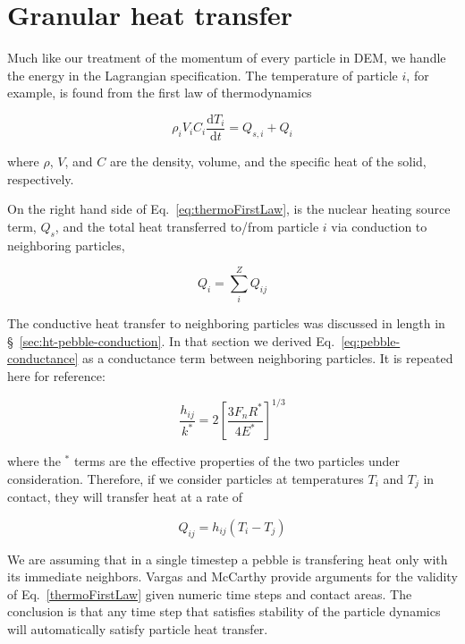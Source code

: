 \section{Granular heat transfer}

Much like our treatment of the momentum of every particle in DEM, we handle the energy in the Lagrangian specification. The temperature of particle $i$, for example, is found from the first law of thermodynamics

\begin{equation}\label{eq:thermoFirstLaw}
	\rho_iV_iC_i\frac{\mathrm{d}T_i}{\mathrm{d}t} = Q_{s,i} + Q_{i}
\end{equation}

where $\rho$, $V$, and $C$ are the density, volume, and the specific heat of the solid, respectively. 

On the right hand side of Eq.~\ref{eq:thermoFirstLaw}, is the nuclear heating source term, $Q_{s}$, and the total heat transferred to/from particle $i$ via conduction to neighboring particles,

\begin{equation}
	Q_i = \sum_{i}^Z Q_{ij}
\end{equation}

The conductive heat transfer to neighboring particles was discussed in length in \S~\ref{sec:ht-pebble-conduction}. In that section we derived Eq.~\ref{eq:pebble-conductance} as a conductance term between neighboring particles. It is repeated here for reference:

\begin{equation*}
	\frac{h_{ij}}{k^*}= 2\left[\frac{3F_nR^*}{4E^*}\right]^{1/3}
\end{equation*}

where the $^*$ terms are the effective properties of the two particles under consideration. Therefore, if we consider particles at temperatures $T_i$ and $T_j$ in contact, they will transfer heat at a rate of

\begin{equation}
	Q_{ij} = h_{ij}(T_i - T_j)
\end{equation} 

We are assuming that in a single timestep a pebble is transfering heat only with its immediate neighbors. Vargas and McCarthy\cite{Vargas2001} provide arguments for the validity of Eq.~\ref{thermoFirstLaw} given numeric time steps and contact areas. The conclusion is that any time step that satisfies stability of the particle dynamics will automatically satisfy particle heat transfer.%



